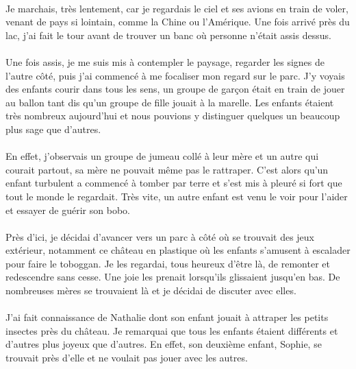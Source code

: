 \paragraph{} Je marchais, très lentement, car je regardais le ciel et ses
avions en train de voler, venant de pays si lointain, comme la Chine ou
l'Amérique. Une fois arrivé près du lac, j'ai fait le tour avant de trouver un
banc où personne n'était assis dessus.

\paragraph{} Une fois assis, je me suis mis à contempler le paysage, regarder
les signes de l'autre côté, puis j'ai commencé à me focaliser mon regard sur le
parc. J'y voyais des enfants courir dans tous les sens, un groupe de garçon
était en train de jouer au ballon tant dis qu'un groupe de fille jouait à la
marelle. Les enfants étaient très nombreux aujourd'hui et nous pouvions y
distinguer quelques un beaucoup plus sage que d'autres.

\paragraph{} En effet, j'observais un groupe de jumeau collé à leur mère et un
autre qui courait partout, sa mère ne pouvait même pas le rattraper. C'est
alors qu'un enfant turbulent a commencé à tomber par terre et s'est mis à
pleuré si fort que tout le monde le regardait. Très vite, un autre enfant est
venu le voir pour l'aider et essayer de guérir son bobo.

\paragraph{} Près d'ici, je décidai d'avancer vers un parc à côté où se
trouvait des jeux extérieur, notamment ce château en plastique où les enfants
s'amusent à escalader pour faire le toboggan. Je les regardai, tous heureux
d'être là, de remonter et redescendre sans cesse. Une joie les prenait
lorsqu'ils glissaient jusqu'en bas. De nombreuses mères se trouvaient là et je
décidai de discuter avec elles.

\paragraph{} J'ai fait connaissance de Nathalie dont son enfant jouait à
attraper les petits insectes près du château. Je remarquai que tous les enfants
étaient différents et d'autres plus joyeux que d'autres. En effet, son deuxième
enfant, Sophie, se trouvait près d'elle et ne voulait pas jouer avec les
autres.


